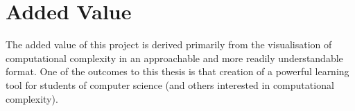 \documentclass[a4paper]{article}
\begin{document}
\section{Added Value}

The added value of this project is derived primarily from the visualisation of computational complexity in an approachable and more readily understandable format. One of the outcomes to this thesis is that creation of a powerful learning tool for students of computer science (and others interested in computational complexity). 
\end{document}
